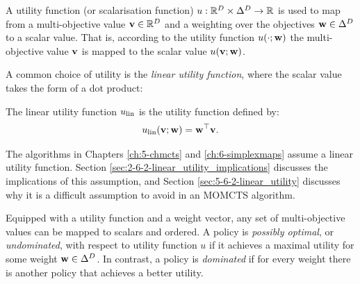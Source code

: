 \begin{defn}
    \label{def:2:utility_fn}
    \label{def:2:scalarisation_fn}
    A \textnormal{utility function} (or \textnormal{scalarisation function}) $u:\mathbb{R}^D\times\Delta^D \rightarrow \mathbb{R}$ is used to map from a multi-objective value $\mathbf{v}\in\mathbb{R}^D$ and a weighting over the objectives $\mathbf{w}\in\Delta^D$ to a scalar value. That is, according to the utility function $u(\cdot;\mathbf{w})$ the multi-objective value $\mathbf{v}$ is mapped to the scalar value $u(\mathbf{v};\mathbf{w})$.
\end{defn}

A common choice of utility is the \textit{linear utility function}, where the scalar value takes the form of a dot product:
\begin{defn}
    \label{def:2:linear_utility_fn}
    \label{def:2:linear_scalarisation_fn}
    The \textnormal{linear utility function} $u_{{\textnormal{lin}}}$ is the utility function defined by:
    \begin{align}
        u_{{\textnormal{lin}}}(\mathbf{v};\mathbf{w}) = \mathbf{w}^\top \mathbf{v}. \label{eq:2:linear_utility_fn_def}
    \end{align}
\end{defn}

The algorithms in Chapters \ref{ch:5-chmcts} and \ref{ch:6-simplexmaps} assume a linear utility function. Section \ref{sec:2-6-2-linear_utility_implications} discusses the implications of this assumption, and Section \ref{sec:5-6-2-linear_utility} discusses why it is a difficult assumption to avoid in an MOMCTS algorithm.

Equipped with a utility function and a weight vector, any set of multi-objective values can be mapped to scalars and ordered. A policy is \textit{possibly optimal}, or \textit{undominated}, with respect to utility function $u$ if it achieves a maximal utility for some weight $\mathbf{w}\in\Delta^D$. In contrast, a policy is \textit{dominated} if for every weight there is another policy that achieves a better utility. 

